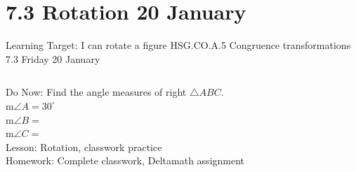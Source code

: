 \documentclass[onlytextwidth, aspectratio=169]{beamer}
\begin{document}
\section{7.3 Rotation \hfill 20 January \,}
\begin{frame}{Learning Target: I can rotate a figure}
  {HSG.CO.A.5 Congruence transformations \hfill \alert{7.3 Friday 20 January}}
  \begin{columns}
    Do Now: Find the angle measures of right $\triangle ABC$. \\
    m$\angle A= 30^\circ$ \\
    m$\angle B=$ \\
    m$\angle C=$ \\[0.5cm]
    Lesson: Rotation, classwork practice \\
    Homework: Complete classwork, Deltamath assignment
    \begin{flushright}
    \end{flushright}
  \end{columns}
\end{frame}
\end{document}
